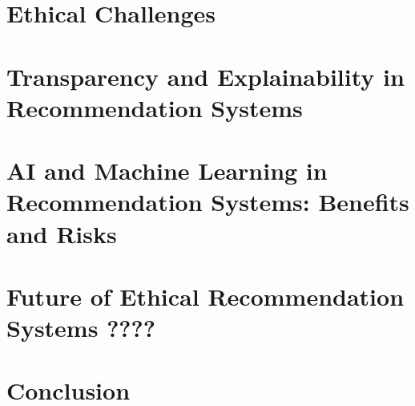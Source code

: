\documentclass{article}
\begin{document}
\section{Ethical Challenges}
\section{Transparency and Explainability in Recommendation Systems}
\section{AI and Machine Learning in Recommendation Systems: Benefits and Risks}
\section{Future of Ethical Recommendation Systems ????}
\section{Conclusion}


\end{document}

